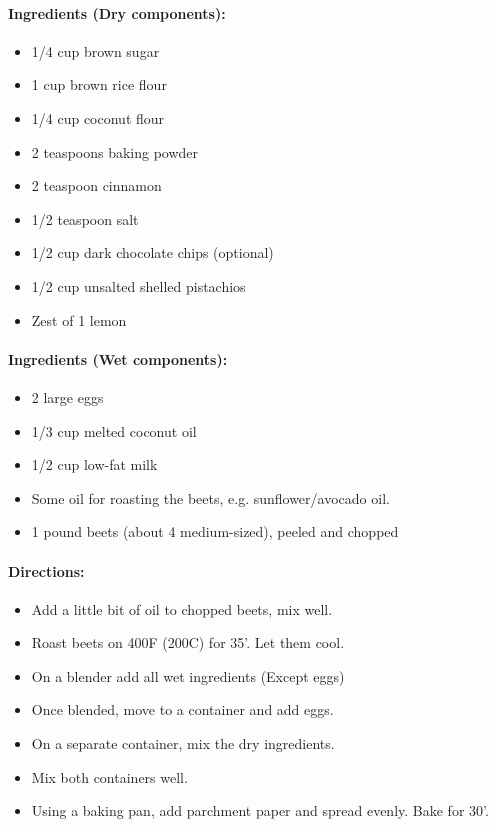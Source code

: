 \documentclass{article}
\begin{document}
\paragraph{Ingredients (Dry components):}
\begin{itemize}
	\item 1/4 cup brown sugar
	\item 1 cup brown rice flour
	\item 1/4 cup coconut flour
	\item 2 teaspoons baking powder
	\item 2 teaspoon cinnamon
	\item 1/2 teaspoon salt
	\item 1/2 cup dark chocolate chips (optional)
	\item 1/2 cup unsalted shelled pistachios
	\item Zest of 1 lemon
\end{itemize}

\paragraph{Ingredients (Wet components):}
\begin{itemize}
	\item 2 large eggs
	\item 1/3 cup melted coconut oil
	\item 1/2 cup low-fat milk
	\item Some oil for roasting the beets, e.g. sunflower/avocado oil.
	\item 1 pound beets (about 4 medium-sized), peeled and chopped
\end{itemize}

\paragraph{Directions:}
\begin{itemize}
	\item Add a little bit of oil to chopped beets, mix well.
	\item Roast beets on 400F (200C) for 35'. Let them cool.
	\item On a blender add all wet ingredients (Except eggs)
	\item Once blended, move to a container and add eggs.
	\item On a separate container, mix the dry ingredients.
	\item Mix both containers well.
	\item Using a baking pan, add parchment paper and spread evenly. Bake for 30'.
\end{itemize}
\end{document}
